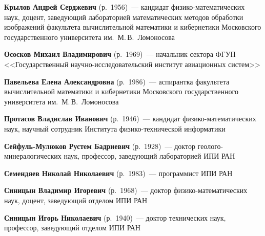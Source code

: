 \begin{multicols}{2}

\noindent
\textbf{Крылов Андрей Серджевич} (р.\ 1956)~--- кандидат физико-математических наук, 
доцент, заведующий лабораторией математических методов обработки изображений факультета вычислительной математики 
и кибернетики Московского
государственного университета им.\ М.\,В.~Ломоносова





\noindent
\textbf{Ососков Михаил Владимирович} (р.\ 1969)~---
начальник сектора ФГУП <<Государственный научно-ис\-сле\-до\-ва\-тельский институт авиационных систем>>


\noindent
\textbf{Павельева Елена Александровна} (р.\ 1986)~--- аспирантка факультета вычислительной математики 
и кибернетики Московского
государственного университета им.\ М.\,В.~Ломоносова


\noindent
\textbf{Протасов Владислав Иванович} (р.\ 1946)~--- 
кандидат физико-математических наук, научный сотрудник Института физико-технической информатики



\noindent
\textbf{Сейфуль-Мулюков Рустем Бадриевич} (р.\ 1928)~--- доктор геолого-минералогических наук, профессор, 
заведующий лабораторией ИПИ РАН 


\noindent
\textbf{Семендяев Николай Николаевич} (р.\ 1983)~--- программист  ИПИ РАН


\noindent
\textbf{Синицын Владимир Игоревич} (р.\ 1968)~--- доктор физико-математических наук, доцент, заведующий отделом ИПИ РАН


\noindent
\textbf{Синицын Игорь Николаевич} (р.\ 1940)~--- доктор технических наук, профессор, заведующий отделом ИПИ РАН


\end{multicols}

